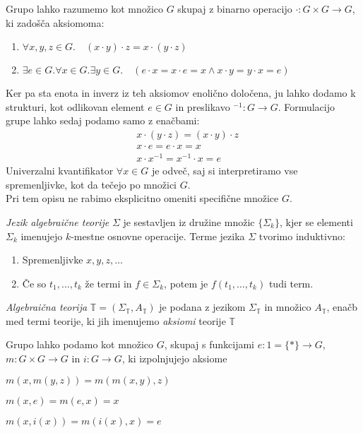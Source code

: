 \documentclass[../kategoricna_logika.tex]{subfiles}
\begin{document}
\begin{primer}
  Grupo lahko razumemo kot množico $G$ skupaj z binarno operacijo
  $\cdot : G \times G \to G$, ki zadošča aksiomoma:
%
  \begin{enumerate}
  \item
    $\forall x,y,z \in G . \quad (x\cdot y) \cdot z = x \cdot (y \cdot
    z)$
  \item
    $\exists e \in G . \forall x \in G . \exists y \in G . \quad (e
    \cdot x = x \cdot e = x \wedge x \cdot y = y \cdot x = e)$
  \end{enumerate}
\end{primer}
Ker pa sta enota in inverz iz teh aksiomov enolično določena, ju lahko
dodamo k strukturi, kot odlikovan element $e \in G$ in preslikavo
$^{-1} : G \to G$.
%
Formulacijo grupe lahko sedaj podamo samo z enačbami: \vspace{1em}
\begin{align*}
  &x \cdot (y \cdot z) = (x \cdot y) \cdot z \\
  &x \cdot e = e \cdot x = x \\
  &x \cdot x^{-1} = x^{-1} \cdot x = e
\end{align*}
Univerzalni kvantifikator $\forall x \in G$ je odveč, saj si interpretiramo vse spremenljivke, kot da tečejo po množici $G$. \\
Pri tem opisu ne rabimo eksplicitno omeniti specifične množice $G$.
%
\begin{definicija}
  \emph{Jezik algebraične teorije} $\Sigma$ je sestavljen iz družine
  množic $\lbrace \Sigma_k \rbrace$, kjer se elementi $\Sigma_k$
  imenujejo $k$-mestne osnovne operacije. Terme jezika $\Sigma$
  tvorimo induktivno:
  \begin{enumerate}
  \item Spremenljivke $x,y,z, \ldots$
  \item Če so $t_1, \ldots, t_k$ že termi in $f \in \Sigma_k$, potem
    je $f(t_1,\ldots, t_k)$ tudi term.
  \end{enumerate}
\end{definicija}
%
\begin{definicija}
  \emph{Algebraična teorija}
  $\mathbb{T} = (\Sigma_\mathbb{T}, A_\mathbb{T})$ je podana z jezikom
  $\Sigma_\mathbb{T}$ in množico $A_\mathbb{T}$, enačb med termi
  teorije, ki jih imenujemo \emph{aksiomi} teorije $\mathbb{T}$
\end{definicija}
%
\begin{primer}
  Grupo lahko podamo kot množico $G$, skupaj s funkcijami
  $e : 1 = \lbrace * \rbrace \to G$, $m : G \times G \to G$ in
  $i : G \to G$, ki izpolnjujejo aksiome
  \begin{description}
  \item $m(x,m(y,z)) = m(m(x,y),z)$
  \item $m(x,e) = m(e,x) = x$
  \item $m(x,i(x)) = m(i(x),x) = e$
  \end{description}
\end{primer}
\end{document}
